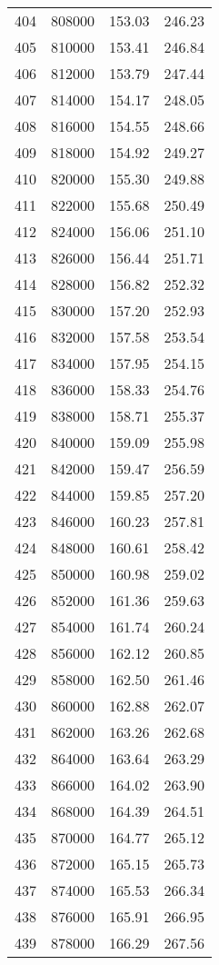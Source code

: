 \documentclass{article}
\begin{document}
\begin{longtable}{@{}l l l l}
404 & 808000 & 153.03 & 246.23\\
405 & 810000 & 153.41 & 246.84\\
406 & 812000 & 153.79 & 247.44\\
407 & 814000 & 154.17 & 248.05\\
408 & 816000 & 154.55 & 248.66\\
409 & 818000 & 154.92 & 249.27\\
410 & 820000 & 155.30 & 249.88\\
411 & 822000 & 155.68 & 250.49\\
412 & 824000 & 156.06 & 251.10\\
413 & 826000 & 156.44 & 251.71\\
414 & 828000 & 156.82 & 252.32\\
415 & 830000 & 157.20 & 252.93\\
416 & 832000 & 157.58 & 253.54\\
417 & 834000 & 157.95 & 254.15\\
418 & 836000 & 158.33 & 254.76\\
419 & 838000 & 158.71 & 255.37\\
420 & 840000 & 159.09 & 255.98\\
421 & 842000 & 159.47 & 256.59\\
422 & 844000 & 159.85 & 257.20\\
423 & 846000 & 160.23 & 257.81\\
424 & 848000 & 160.61 & 258.42\\
425 & 850000 & 160.98 & 259.02\\
426 & 852000 & 161.36 & 259.63\\
427 & 854000 & 161.74 & 260.24\\
428 & 856000 & 162.12 & 260.85\\
429 & 858000 & 162.50 & 261.46\\
430 & 860000 & 162.88 & 262.07\\
431 & 862000 & 163.26 & 262.68\\
432 & 864000 & 163.64 & 263.29\\
433 & 866000 & 164.02 & 263.90\\
434 & 868000 & 164.39 & 264.51\\
435 & 870000 & 164.77 & 265.12\\
436 & 872000 & 165.15 & 265.73\\
437 & 874000 & 165.53 & 266.34\\
438 & 876000 & 165.91 & 266.95\\
439 & 878000 & 166.29 & 267.56\\

\end{longtable}
\end{document}
